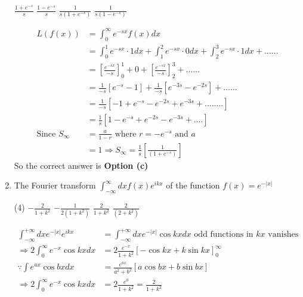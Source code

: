 \begin{enumerate}
\begin{tasks}
	\task[\textbf{A.}] $\frac{1+e^{-s}}{s}$
	\task[\textbf{B.}] $\frac{1-e^{-s}}{s}$
	\task[\textbf{C.}] $\frac{1}{s\left(1+e^{-s}\right)}$
	\task[\textbf{D.}]  $\frac{1}{s\left(1-e^{-s}\right)}$
\end{tasks}
\begin{answer}
	$$
	\begin{aligned}
	L(f(x))&=\int_{0}^{\infty} e^{-s x} f(x) d x\\&=\int_{0}^{1} e^{-s x} \cdot 1 d x+\int_{1}^{2} e^{-s x} \cdot 0 d x+\int_{2}^{3} e^{-s x} \cdot 1 d x+\ldots \ldots\\
	&=\left[\frac{e^{-s x}}{-s}\right]_{0}^{1}+0+\left[\frac{e^{-s x}}{-s}\right]_{2}^{3}+\ldots \ldots\\&=\frac{1}{-s}\left[e^{-s}-1\right]+\frac{1}{-s}\left[e^{-3 s}-e^{-2 s}\right]+\ldots \ldots\\
	&=\frac{1}{-s}\left[-1+e^{-s}-e^{-2 s}+e^{-3 s}+\ldots \ldots . .\right]\\&=\frac{1}{s}\left[1-e^{-s}+e^{-2 s}-e^{-3 s}+\ldots .\right]\\
	\text{Since }S_{\infty}&=\frac{a}{1-r}\text{ where }r=-e^{-s}\text{ and }a\\&=1 \Rightarrow S_{\infty}=\frac{1}{s}\left[\frac{1}{\left(1+e^{-s}\right)}\right]
	\end{aligned}
	$$
		So the correct answer is \textbf{Option (c)}
\end{answer}
\item The Fourier transform $\int_{-\infty}^{\infty} d x f(x) e^{i k x}$ of the function $f(x)=e^{-|x|}$
\begin{tasks}(4)
	\task[\textbf{A.}] $-\frac{2}{1+k^{2}}$
	\task[\textbf{B.}] $-\frac{1}{2\left(1+k^{2}\right)}$
	\task[\textbf{C.}] $\frac{2}{1+k^{2}}$
	\task[\textbf{D.}] $\frac{2}{\left(2+k^{2}\right)}$
\end{tasks}
\begin{answer}
	$$
	\begin{aligned}
\int_{-\infty}^{+\infty} d x e^{-|x|} e^{i k x}&=\int_{-\infty}^{+\infty} d x e^{-|x|} \cos k x d x\text{ odd functions in }k x\text{ vanishes}\\
\Rightarrow 2 \int_{0}^{\infty} e^{-x} \cos k x d x&=2 \frac{e^{-x}}{1+k^{2}}[-\cos k x+k \sin k x]_{0}^{\infty}\\
\because \int e^{a x} \cos b x d x&=\frac{e^{a x}}{a^{2}+b^{2}}[a \cos b x+b \sin b x]\\
\Rightarrow 2 \int_{0}^{\infty} e^{-x} \cos k x d x&=2 \frac{e^{0}}{1+k^{2}}=\frac{2}{1+k^{2}}
\end{aligned}
$$
\end{answer}
\end{enumerate}
